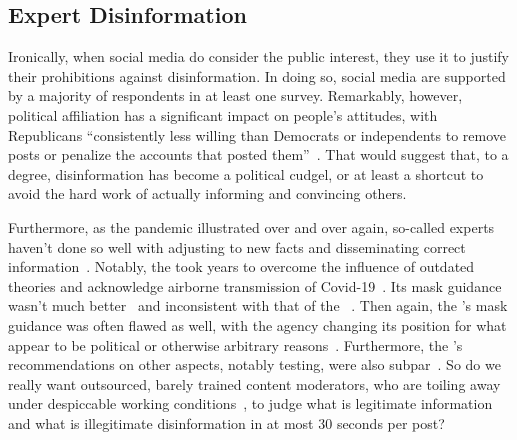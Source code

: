 \subsection{Expert Disinformation}

Ironically, when social media do consider the public interest, they use it to
justify their prohibitions against disinformation. In doing so, social media are
supported by a majority of  respondents in at least one survey. Remarkably,
however, political affiliation has a significant impact on people's attitudes,
with Republicans ``consistently less willing than Democrats or independents to
remove posts or penalize the accounts that posted
them''~\cite{KozyrevaHerzogea2023}. That would suggest that, to a degree,
disinformation has become a political cudgel, or at least a shortcut to avoid
the hard work of actually informing and convincing others.

Furthermore, as the pandemic illustrated over and over again, so-called experts
haven't done so well with adjusting to new facts and disseminating correct
information~\cite{SinghMcNabea2021}. Notably, the  took years to overcome
the influence of outdated theories and acknowledge airborne transmission of
Covid-19~\cite{Chamary2021,GreenhalghOzbilginea2022,JimenezMarrea2022,Lewis2022,SirleafClark2021,SirleafClarkea2021}.
Its mask guidance wasn't much better~\cite{ChanLeungea2020} and inconsistent
with that of the ~\cite{Curtis2020}. Then again, the 's mask
guidance was often flawed as well, with the agency changing its position for
what appear to be political or otherwise arbitrary reasons~\cite{Netburn2021}.
Furthermore, the 's recommendations on other aspects, notably testing,
were also subpar~\cite{Flam2022,Ngo2022,Scott2022}. So do we really want
outsourced, barely trained content moderators, who are toiling away under
despiccable working conditions~\cite{Newton2019b,Newton2019}, to judge what is
legitimate information and what is illegitimate disinformation in at most 30
seconds per post?


